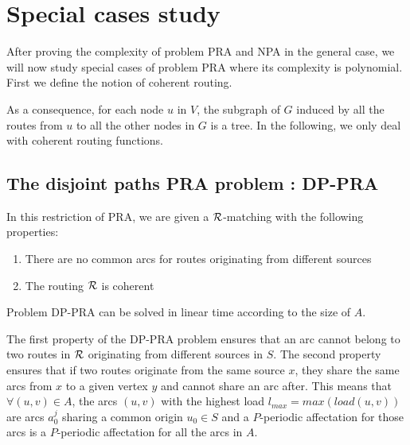 \documentclass{article}
\newcommand\rmatching{$\cal R$-matching\xspace}
\begin{document}
{

\section{Special cases study}

After proving the complexity of problem PRA and NPA in the general case, we will now study special cases of problem PRA where its complexity is polynomial. First we define the notion of coherent routing.
% 

As a consequence, for each node $u$ in $V$, the subgraph of $G$ induced by all the routes from $u$ to all the other nodes in $G$ is a tree. In the following, we only deal with coherent routing functions.

\subsection{The disjoint paths PRA problem : DP-PRA}
In this restriction of PRA, we are given a \rmatching with the following properties:
\begin{enumerate}
\item There are no common arcs for routes originating from different sources
\item The routing $\cal R$ is coherent 
\end{enumerate}

\begin{proposition}
\label{DP-PRA}
Problem DP-PRA can be solved in linear time according to the size of $A$.
\end{proposition}

The first property of the DP-PRA problem ensures that an arc cannot belong to two routes in $\cal R$ originating from different sources in $S$. The second property ensures that if two routes originate from the same source $x$, they share the same arcs from $x$ to a given vertex $y$ and cannot share an arc after. This means that $\forall (u,v) \in A$, the arcs $(u,v)$ with the highest load $l_{max} = max(load(u,v))$ are arcs $a_0^j$ sharing a common origin $u_0 \in S$ and a $P$-periodic affectation for those arcs is a $P$-periodic affectation for all the arcs in $A$.

}
\end{document}
